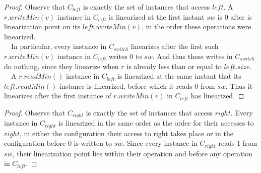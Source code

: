 \documentclass{beamer}
\begin{document}
\begin{frame}
	\begin{proof}
		Observe that $C_{left}$ is exactly the set of instances that access $left$. 
		A $r.writeMin(v)$ instance in $C_{left}$ is linearized at the first instant $sw$ is 0 
		after is linearization point on its $left.writeMin(v)$, in the order these operations were linearized.
		\\~\
		In particular, every instance in $C_{switch}$ linearizes after the first such $r.writeMin(v)$
		instance in $C_{left}$ writes 0 to $sw$.  
		And thus these writes in $C_{switch}$ do nothing, since they linearize when $r$
		is already less than or equal to $left.size$.
		\\~\
		A $r.readMin()$ instance in $C_{left}$ is linearized at the same instant 
		that its $left.readMin()$ instance is linearized, before which it reads 0 from $sw$.
		Thus it linearizes after the first instance of $r.writeMin(v)$ in $C_{left}$ has linearized.
	\end{proof}
\end{frame}
\begin{frame}
	\begin{proof}
		Observe that $C_{right}$ is exactly the set of instances that access $right$.
		Every instance in $C_{right}$ is linearized in the same order as the order for their accesses to $right$,
		in either the configuration their access to right takes place or in the configuration before 0 is written to $sw$.
		Since every instance in $C_{right}$ reads 1 from $sw$, their linearization point lies within their operation
		and before any operation in $C_{left}$.
	\end{proof}
\end{frame}
\end{document}
